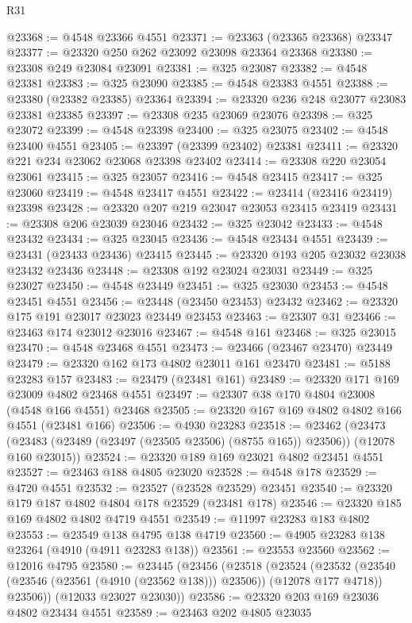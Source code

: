 \begin{lexlean}{R31}
\begin{coremodule}
@23368 := @4548 @23366 @4551
@23371 := @23363 (@23365 @23368) @23347
@23377 := @23320 @250 @262 @23092 @23098 @23364 @23368
@23380 := @23308 @249 @23084 @23091
@23381 := @325 @23087
@23382 := @4548 @23381
@23383 := @325 @23090
@23385 := @4548 @23383 @4551
@23388 := @23380 (@23382 @23385) @23364
@23394 := @23320 @236 @248 @23077 @23083 @23381 @23385
@23397 := @23308 @235 @23069 @23076
@23398 := @325 @23072
@23399 := @4548 @23398
@23400 := @325 @23075
@23402 := @4548 @23400 @4551
@23405 := @23397 (@23399 @23402) @23381
@23411 := @23320 @221 @234 @23062 @23068 @23398 @23402
@23414 := @23308 @220 @23054 @23061
@23415 := @325 @23057
@23416 := @4548 @23415
@23417 := @325 @23060
@23419 := @4548 @23417 @4551
@23422 := @23414 (@23416 @23419) @23398
@23428 := @23320 @207 @219 @23047 @23053 @23415 @23419
@23431 := @23308 @206 @23039 @23046
@23432 := @325 @23042
@23433 := @4548 @23432
@23434 := @325 @23045
@23436 := @4548 @23434 @4551
@23439 := @23431 (@23433 @23436) @23415
@23445 := @23320 @193 @205 @23032 @23038 @23432 @23436
@23448 := @23308 @192 @23024 @23031
@23449 := @325 @23027
@23450 := @4548 @23449
@23451 := @325 @23030
@23453 := @4548 @23451 @4551
@23456 := @23448 (@23450 @23453) @23432
@23462 := @23320 @175 @191 @23017 @23023 @23449 @23453
@23463 := @23307 @31
@23466 := @23463 @174 @23012 @23016
@23467 := @4548 @161
@23468 := @325 @23015
@23470 := @4548 @23468 @4551
@23473 := @23466 (@23467 @23470) @23449
@23479 := @23320 @162 @173 @4802 @23011 @161 @23470
@23481 := @5188 @23283 @157
@23483 := @23479 (@23481 @161)
@23489 := @23320 @171 @169 @23009 @4802 @23468 @4551
@23497 := @23307 @38 @170 @4804 @23008 (@4548 @166 @4551) @23468
@23505 := @23320 @167 @169 @4802 @4802 @166 @4551 (@23481 @166)
@23506 := @4930 @23283
@23518 := @23462
    (@23473 (@23483 (@23489 (@23497 (@23505 @23506) (@8755 @165)) @23506)) (@12078 @160 @23015))
@23524 := @23320 @189 @169 @23021 @4802 @23451 @4551
@23527 := @23463 @188 @4805 @23020
@23528 := @4548 @178
@23529 := @4720 @4551
@23532 := @23527 (@23528 @23529) @23451
@23540 := @23320 @179 @187 @4802 @4804 @178 @23529 (@23481 @178)
@23546 := @23320 @185 @169 @4802 @4802 @4719 @4551
@23549 := @11997 @23283 @183 @4802
@23553 := @23549 @138 @4795 @138 @4719
@23560 := @4905 @23283 @138 @23264 (@4910 (@4911 @23283 @138))
@23561 := @23553 @23560
@23562 := @12016 @4795
@23580 := @23445
    (@23456
      (@23518
        (@23524
          (@23532 (@23540 (@23546 (@23561 (@4910 (@23562 @138))) @23506)) (@12078 @177 @4718))
          @23506))
      (@12033 @23027 @23030))
@23586 := @23320 @203 @169 @23036 @4802 @23434 @4551
@23589 := @23463 @202 @4805 @23035

\end{coremodule}
\end{lexlean}
